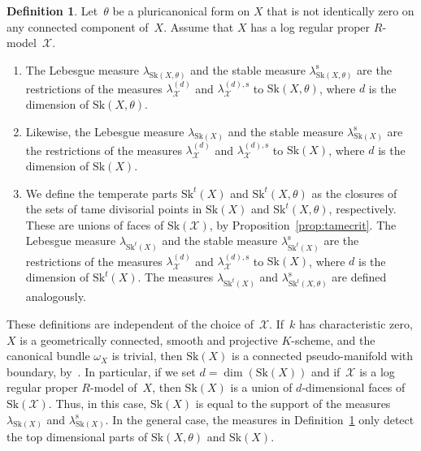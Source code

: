 \documentclass[JEP,XML,SOM,Unicode,NoFloatCountersInSection]{cedram}
\theoremstyle{definition}
\newtheorem{definition}[equation]{Definition}
\numberwithin{equation}{subsection}
\newcommand{\cX}{\ensuremath{\mathscr{X}}}
\newcommand{\Sk}{\mathrm{Sk}}
\newcommand{\rs}{\mathrm{s}}
\let\form\theta
\let\Leb\lambda
\begin{document}
\begin{definition}\label{defi:skmeasures}
Let~$\form$ be a pluricanonical form on $X$ that is not identically zero on any connected component of~$X$.
Assume that $X$ has a log regular proper $R$\nobreakdash-model~$\cX$.

\begin{enumerate}
\item The Lebesgue measure $\Leb_{\Sk(X,\form)}$ and the stable measure $\Leb^{\rs}_{\Sk(X,\form)}$ are
the restrictions of the measures $\Leb_{\cX}^{(d)}$ and $\Leb^{(d),\rs}_{\cX}$ to $\Sk(X,\form)$, where $d$ is the dimension of $\Sk(X,\form)$.

\item
Likewise, the Lebesgue measure $\Leb_{\Sk(X)}$ and the stable measure $\Leb^{\rs}_{\Sk(X)}$ are
the restrictions of the measures $\Leb_{\cX}^{(d)}$ and $\Leb^{(d),\rs}_{\cX}$ to $\Sk(X)$, where $d$ is the dimension of $\Sk(X)$.

\item We define the temperate parts $\Sk^t(X)$ and $\Sk^t(X,\form)$ as the closures of the sets of tame divisorial points in $\Sk(X)$ and $\Sk^t(X,\form)$, respectively. These are unions of faces of $\Sk(\cX)$, by Proposition~\ref{prop:tamecrit}.
The Lebesgue measure $\Leb_{\Sk^t(X)}$ and the stable measure $\Leb^{\rs}_{\Sk^t(X)}$ are
the restrictions of the measures $\Leb_{\cX}^{(d)}$ and $\Leb^{(d),\rs}_{\cX}$ to $\Sk(X)$, where $d$ is the dimension of $\Sk^t(X)$. The measures $\Leb_{\Sk^t(X)}$ and $\Leb^{\rs}_{\Sk^t(X,\form)}$ are defined analogously.
\end{enumerate}
\end{definition}
These definitions are independent of the choice of~$\cX$.
If~$k$ has characteristic zero, $X$ is a geometrically connected, smooth and projective $K$\nobreakdash-scheme, and the canonical bundle
$\omega_X$ is trivial, then $\Sk(X)$ is a connected pseudo-manifold with boundary, by~\cite[4.2.4]{NiXu}. In particular, if we set $d=\dim(\Sk(X))$ and if~$\cX$ is a log regular proper $R$\nobreakdash-model of~$X$, then $\Sk(X)$ is a union of $d$-dimensional faces of $\Sk(\cX)$. Thus, in this case, $\Sk(X)$ is equal to the support of the measures $\Leb_{\Sk(X)}$ and $\Leb^{\rs}_{\Sk(X)}$. In the general case, the measures in Definition~\ref{defi:skmeasures} only detect the top dimensional parts of $\Sk(X,\form)$ and $\Sk(X)$.
\end{document}
